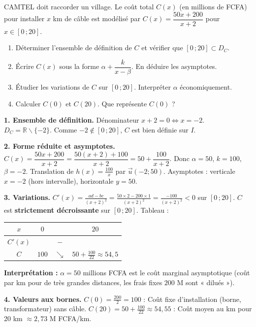 \documentclass[11pt]{article}
\newcommand{\cle}[1]{{\popxbold\color{popdark}#1}}
\def\setminus{\mathbin{\backslash}}\let\smallsetminus\setminus
\begin{document}
\begin{exoresolu}
CAMTEL doit raccorder un village. Le coût total $C(x)$ (en millions de FCFA) pour installer $x$ km de câble est modélisé par $C(x)=\dfrac{50x+200}{x+2}$ pour $x\in[0\,;20]$.
\begin{enumerate}
\item Déterminer l'ensemble de définition de $C$ et vérifier que $[0\,;20]\subset D_C$.
\item Écrire $C(x)$ sous la forme $\alpha+\dfrac{k}{x-\beta}$. En déduire les asymptotes.
\item Étudier les variations de $C$ sur $[0\,;20]$. Interpréter $\alpha$ économiquement.
\item Calculer $C(0)$ et $C(20)$. Que représente $C(0)$ ?
\end{enumerate}
\tcblower
\textbf{1. Ensemble de définition.}
Dénominateur $x+2=0 \iff x=-2$. $D_C=\mathbb{R}\setminus\{-2\}$. Comme $-2\notin[0\,;20]$, $C$ est bien définie sur $I$.

\textbf{2. Forme réduite et asymptotes.}
$C(x)=\dfrac{50x+200}{x+2}=\dfrac{50(x+2)+100}{x+2}=50+\dfrac{100}{x+2}$.
Donc $\alpha=50$, $k=100$, $\beta=-2$.
Translation de $h(x)=\frac{100}{x}$ par $\vec{u}(-2;50)$.
Asymptotes : verticale $x=-2$ (hors intervalle), horizontale $y=50$.

\textbf{3. Variations.}
$C'(x)=\frac{ad-bc}{(x+2)^2}=\frac{50\times2 - 200\times1}{(x+2)^2}=\frac{-100}{(x+2)^2}<0$ sur $[0\,;20]$.
$C$ est \textbf{strictement décroissante} sur $[0\,;20]$.
Tableau :
\begin{center}
\begin{tabular}{|c|ccc|}\hline
$x$ & $0$ & & $20$ \\ \hline
$C'(x)$ & & $-$ & \\ \hline
$C$ & $100$ & $\searrow$ & $50+\frac{100}{22}\approx54,5$ \\ \hline
\end{tabular}
\end{center}
\textbf{Interprétation :} $\alpha=50$ millions FCFA est le \cle{coût marginal asymptotique} (coût par km pour de très grandes distances, les frais fixes $200$ M sont « dilués »).

\textbf{4. Valeurs aux bornes.}
$C(0)=\frac{200}{2}=100$ : Coût fixe d'installation (borne, transformateur) sans câble.
$C(20)=50+\frac{100}{22}\approx54,55$ : Coût moyen au km pour 20 km $\approx 2,73$ M FCFA/km.
\end{exoresolu}
\end{document}
